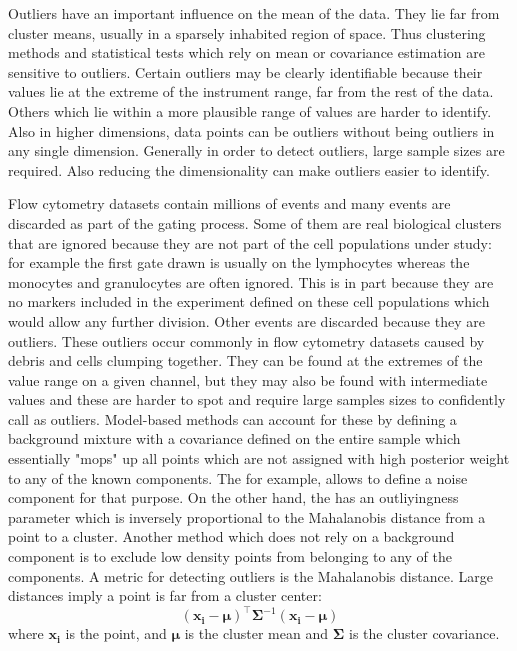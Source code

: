 Outliers have an important influence on the mean of the data.
They lie far from cluster means, usually in a sparsely inhabited region of space.
Thus clustering methods and statistical tests which rely on mean or covariance estimation are sensitive to outliers.
Certain outliers may be clearly identifiable because their values lie at the extreme of the instrument range, far from the rest of the data.
Others which lie within a more plausible range of values are harder to identify.
Also in higher dimensions, data points can be outliers without being outliers in any single dimension.
Generally in order to detect outliers, large sample sizes are required.
Also reducing the dimensionality can make outliers easier to identify.

Flow cytometry datasets contain millions of events and many events are discarded as part of the gating process.
Some of them are real biological clusters that are ignored because they are not part of the cell populations under study:
for example the first gate drawn is usually on the lymphocytes whereas the monocytes and granulocytes are often ignored.
This is in part because they are no markers included in the experiment defined on these cell populations which would allow any further division.
Other events are discarded because they are outliers.
These outliers occur commonly in flow cytometry datasets caused by debris and cells clumping together.
They can be found at the extremes of the value range on a given channel, but they may also be found with intermediate values and these are harder to spot and require large samples sizes to confidently call as outliers.
Model-based methods can account for these by defining a background mixture with a covariance defined on the entire sample which essentially "mops" up all points
which are not assigned with high posterior weight to any of the known components.
The  for example, allows to define a noise component for that purpose.
On the other hand, the  has an outliyingness parameter which is inversely proportional to the Mahalanobis distance from a point to a cluster.
Another method which does not rely on a background component is to exclude low density points from belonging to any of the components.
A metric for detecting outliers is the Mahalanobis distance.  Large distances imply a point is far from a cluster center:
\begin{equation} \label{equation:Mahalanobis}
(\boldsymbol{x_i}-\boldsymbol{\mu})^{\top}\boldsymbol{\Sigma}^{-1}(\boldsymbol{x_i}-\boldsymbol{\mu})
\end{equation}
where $\boldsymbol{x_i}$ is the point, and $\boldsymbol{\mu}$ is the cluster mean and $\boldsymbol{\Sigma}$ is the cluster covariance.

